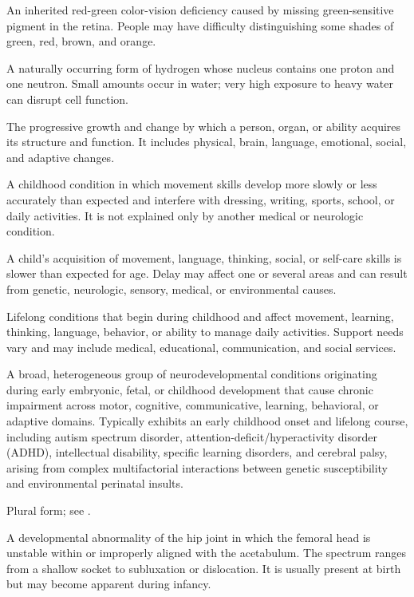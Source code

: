  An inherited red-green color-vision deficiency caused by missing green-sensitive pigment in the retina. People may have difficulty distinguishing some shades of green, red, brown, and orange.

 A naturally occurring form of hydrogen whose nucleus contains one proton and one neutron. Small amounts occur in water; very high exposure to heavy water can disrupt cell function.

 The progressive growth and change by which a person, organ, or ability acquires its structure and function. It includes physical, brain, language, emotional, social, and adaptive changes.

 A childhood condition in which movement skills develop more slowly or less accurately than expected and interfere with dressing, writing, sports, school, or daily activities. It is not explained only by another medical or neurologic condition.

 A child’s acquisition of movement, language, thinking, social, or self-care skills is slower than expected for age. Delay may affect one or several areas and can result from genetic, neurologic, sensory, medical, or environmental causes.

 Lifelong conditions that begin during childhood and affect movement, learning, thinking, language, behavior, or ability to manage daily activities. Support needs vary and may include medical, educational, communication, and social services.

 A broad, heterogeneous group of neurodevelopmental conditions originating during early embryonic, fetal, or childhood development that cause chronic impairment across motor, cognitive, communicative, learning, behavioral, or adaptive domains. Typically exhibits an early childhood onset and lifelong course, including autism spectrum disorder, attention-deficit/hyperactivity disorder (ADHD), intellectual disability, specific learning disorders, and cerebral palsy, arising from complex multifactorial interactions between genetic susceptibility and environmental perinatal insults.

 Plural form; see .

 A developmental abnormality of the hip
joint in which the femoral head is unstable within or improperly aligned with the
acetabulum. The spectrum ranges from a shallow socket to subluxation or dislocation.
It is usually present at birth but may become apparent during infancy.

